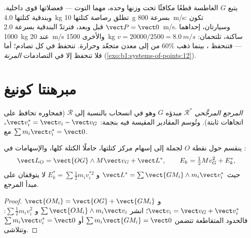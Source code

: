 \begin{example}\label{ex:b1:systems-of-points:cm}
يتبع $G$ الغاطسة قطعًا مكافئًا تحت وزنها وحده، مهما
التوت --- فعضلاتها قوى داخلية. وبندقية كتلتها \qty{4.0}{kg}
تطلق رصاصة كتلتها \qty{10}{g} بسرعة \qty{800}{m/s}: تكون $\vect P = \vect 0$ قبل
وبعد، فترتدّ البندقية بسرعة \qty{2.0}{m/s}. وسيارتان، إحداهما \qty{1000}{kg}
عند \qty{20}{m/s} والأخرى \qty{1500}{kg} ساكنة، تلتحمان: $v =
20000/2500 = \qty{8.0}{m/s}$ --- فتنحفظ ، بينما ذهب $60\%$ من
 إلى معدن متجعّد وحرارة. 
تنحفظ في كل تصادم؛ أما  فلا تنحفظ إلا في التصادمات \emph{المرنة}
(\cref{exo:b1:systems-of-points:12}).
\end{example}

\section{مبرهنتا كونيغ}

\begin{definition}\label{def:b1:systems-of-points:barycentric}
\emph{المرجع المرجَّحي} $\mathcal R^*$ مبدؤه $G$ وهو
في انسحاب بالنسبة إلى  $\mathcal R$ (فمحاوره
تحافظ على اتجاهات ثابتة). وتُوسم المقادير المقيسة فيه بنجمة: $\vect v_i^*
= \vect v_i - \vect v_G$، مع $\sum m_i\vect v_i^* = \vect 0$.
\end{definition}

\begin{theorem}\label{thm:b1:systems-of-points:koenig}
ينقسم  حول نقطة $O$  لجملة
إلى إسهام مركز كتلتها، حاملًا الكتلة
كلها، والإسهامات في :
\[
\vect L_O = \vect{OG}\wedge M\vect v_G + \vect L^*, \qquad
E_k = \tfrac12 Mv_G^2 + E_k^*,
\]
حيث $\vect L^* = \sum\vect{GM_i}\wedge m_i\vect v_i^*$ و $E_k^* = \sum\tfrac12
m_iv_i^{*2}$ لا يتوقفان على مبدأ المرجع.
\end{theorem}

\begin{proof}
$\vect{OM_i} = \vect{OG} + \vect{GM_i}$ و $\vect v_i = \vect v_G + \vect v_i^*$؛
انشر $\sum\vect{OM_i}\wedge m_i\vect v_i$ و $\sum\tfrac12 m_iv_i^2$: فالحدود
المتقاطعة تتضمن $\sum m_i\vect{GM_i} = \vect 0$ أو $\sum m_i\vect v_i^* = \vect 0$
وتتلاشى.
\end{proof}

